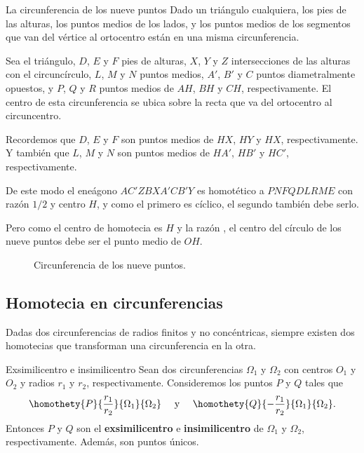 \begin{section-example.tcb}{La circunferencia de los nueve puntos}{}
    Dado un triángulo cualquiera, los pies de las alturas, los puntos medios de los lados, y los puntos medios de los segmentos que van del vértice al ortocentro están en una misma circunferencia.
\end{section-example.tcb}
\begin{solution}
    \begin{multicols}{2}
        Sea  el triángulo, $D$, $E$ y $F$ pies de alturas, $X$, $Y$ y $Z$ intersecciones de las alturas con el circuncírculo, $L$, $M$ y $N$ puntos medios, $A'$, $B'$ y $C$ puntos diametralmente opuestos, y $P$, $Q$ y $R$ puntos medios de $AH$, $BH$ y $CH$, respectivamente.
        El centro de esta circunferencia se ubica sobre la recta que va del ortocentro al circuncentro.


        Recordemos que $D$, $E$ y $F$ son puntos medios de $HX$, $HY$ y $HX$, respectivamente.
        Y también que $L$, $M$ y $N$ son puntos medios de $HA'$, $HB'$ y $HC'$, respectivamente.


        De este modo el eneágono $AC' ZBXA' CB' Y$ es homotético a $PNFQDLRME$ con razón $1/2$ y centro $H$, y como el primero es cíclico, el segundo también debe serlo.

        Pero como el centro de homotecia es $H$ y la razón , el centro del círculo de los nueve puntos debe ser el punto medio de $OH$.\qedhere
        \begin{figure}[H]
            \centering
            
            \caption{Circunferencia de los nueve puntos.}
        \end{figure}
    \end{multicols}
\end{solution}



\subsection{Homotecia en circunferencias}
Dadas dos circunferencias de radios finitos y no concéntricas, siempre existen dos homotecias que transforman una circunferencia en la otra.

\begin{section-definition.tcb}{Exsimilicentro e insimilicentro}{}
    Sean dos circunferencias $\Omega_1$ y $\Omega_2$ con centros $O_1$ y $O_2$ y radios $r_1$ y $r_2$, respectivamente.
    Consideremos los puntos $P$ y $Q$ tales que
    \[
        \homothety{P}{\dfrac{r_1}{r_2}}{\Omega_1}{\Omega_2} \quad \  \text{y}\  \quad \homothety{Q}{-\dfrac{r_1}{r_2}}{\Omega_1}{\Omega_2}.
    \]
    Entonces $P$ y $Q$ son el \textbf{exsimilicentro} e \textbf{insimilicentro} de $\Omega_1$ y $\Omega_2$, respectivamente.
    Además, son puntos únicos.
\end{section-definition.tcb}

